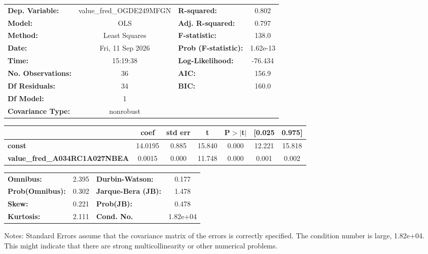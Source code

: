 \begin{center}
\begin{tabular}{lclc}
\toprule
\textbf{Dep. Variable:}               & value\_fred\_OGDE249MFGN & \textbf{  R-squared:         } &     0.802   \\
\textbf{Model:}                       &           OLS            & \textbf{  Adj. R-squared:    } &     0.797   \\
\textbf{Method:}                      &      Least Squares       & \textbf{  F-statistic:       } &     138.0   \\
\textbf{Date:}                        &     Fri, 11 Sep 2026     & \textbf{  Prob (F-statistic):} &  1.62e-13   \\
\textbf{Time:}                        &         15:19:38         & \textbf{  Log-Likelihood:    } &   -76.434   \\
\textbf{No. Observations:}            &              36          & \textbf{  AIC:               } &     156.9   \\
\textbf{Df Residuals:}                &              34          & \textbf{  BIC:               } &     160.0   \\
\textbf{Df Model:}                    &               1          & \textbf{                     } &             \\
\textbf{Covariance Type:}             &        nonrobust         & \textbf{                     } &             \\
\bottomrule
\end{tabular}
\begin{tabular}{lcccccc}
                                      & \textbf{coef} & \textbf{std err} & \textbf{t} & \textbf{P$> |$t$|$} & \textbf{[0.025} & \textbf{0.975]}  \\
\midrule
\textbf{const}                        &      14.0195  &        0.885     &    15.840  &         0.000        &       12.221    &       15.818     \\
\textbf{value\_fred\_A034RC1A027NBEA} &       0.0015  &        0.000     &    11.748  &         0.000        &        0.001    &        0.002     \\
\bottomrule
\end{tabular}
\begin{tabular}{lclc}
\textbf{Omnibus:}       &  2.395 & \textbf{  Durbin-Watson:     } &    0.177  \\
\textbf{Prob(Omnibus):} &  0.302 & \textbf{  Jarque-Bera (JB):  } &    1.478  \\
\textbf{Skew:}          &  0.221 & \textbf{  Prob(JB):          } &    0.478  \\
\textbf{Kurtosis:}      &  2.111 & \textbf{  Cond. No.          } & 1.82e+04  \\
\bottomrule
\end{tabular}
\end{center}

Notes: \newline
 [1] Standard Errors assume that the covariance matrix of the errors is correctly specified. \newline
 [2] The condition number is large, 1.82e+04. This might indicate that there are \newline
 strong multicollinearity or other numerical problems.